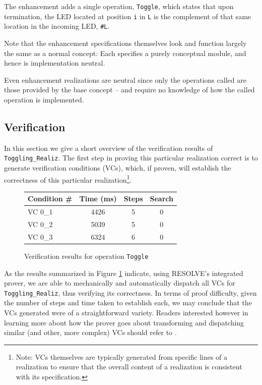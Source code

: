 \documentclass{sig-alternate}
\begin{document}
The enhancement adds a single operation, \texttt{Toggle}, which states that upon termination, the LED located at position \texttt{i} in \texttt{L} is the complement of that same location in the incoming LED, \texttt{\#L}.

Note that the enhancement specifications themselves look and function largely the same as a normal concept: Each specifies a purely conceptual module, and hence is implementation neutral. 

Even enhancement realizations are neutral since only the operations called are those provided by the base concept -- and require no knowledge of how the called operation is implemented.

\subsection{Verification}

In this section we give a short overview of the verification results of \texttt{Toggling\_Realiz}. The first step in proving this particular realization correct is to generate verification conditions (VCs), which, if proven, will establish the correctness of this particular realization\footnote{Note: VCs themselves are typically generated from specific lines of a realization to ensure that the overall content of a realization is consistent with its specification.}.

\begin{figure}[!htb]
\centering
\begin{tabular}{lccc}
	\toprule
	Condition \# & Time (ms)	& Steps	& Search \\
	\midrule
	VC 0\_1	& 4426	& 5	& 0	\\
	VC 0\_2	& 5039	& 5	& 0	\\
	VC 0\_3	& 6324	& 6	& 0	\\
	\bottomrule
\end{tabular}
\caption{Verification results for operation \texttt{Toggle}}
\label{fig:results}
\end{figure}

As the results summarized in Figure \ref{fig:results} indicate, using RESOLVE's integrated prover, we are able to mechanically and automatically dispatch all VCs for \texttt{Toggling\_Realiz}, thus verifying its correctness. In terms of proof difficulty, given the number of steps and time taken to establish each, we may conclude that the VCs generated were of a straightforward variety. Readers interested however in learning more about how the prover goes about transforming and dispatching similar (and other, more complex) VCs should refer to \cite{smith:2013}.
\end{document}
